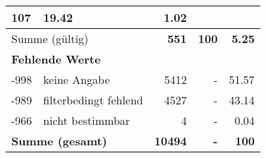 \begin{longtable}{lXrrr}
       \num{107} &
       \num[round-mode=places,round-precision=2]{19.42} &
         \num[round-mode=places,round-precision=2]{1.02} \\
     \midrule
     \multicolumn{2}{l}{Summe (gültig)} &
       \textbf{\num{551}} &
     \textbf{\num{100}} &
       \textbf{\num[round-mode=places,round-precision=2]{5.25}} \\
     \multicolumn{5}{l}{\textbf{Fehlende Werte}}\\
       -998 &
       keine Angabe &
         \num{5412} &
        - &
         \num[round-mode=places,round-precision=2]{51.57} \\
       -989 &
       filterbedingt fehlend &
         \num{4527} &
        - &
         \num[round-mode=places,round-precision=2]{43.14} \\
       -966 &
       nicht bestimmbar &
         \num{4} &
        - &
         \num[round-mode=places,round-precision=2]{0.04} \\
     \midrule
     \multicolumn{2}{l}{\textbf{Summe (gesamt)}} &
          \textbf{\num{10494}} &
        \textbf{-} &
        \textbf{\num{100}} \\
     \bottomrule
     \end{longtable}
     
